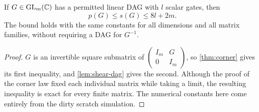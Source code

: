 \begin{corollary}
\label{cor:dag-price}
If $G\in\operatorname{GL}_m(\mathbb C)$ has a permitted linear DAG with $l$ scalar
gates, then
\[
 p(G)\le s(G)\le 8l+2m.
\]
The bound holds with the same constants for all dimensions and all
matrix families, without requiring a DAG for $G^{-1}$.
\end{corollary}

\begin{proof}
$G$ is an invertible square submatrix of
$\begin{pmatrix}I_m&G\\0&I_m\end{pmatrix}$, so
\cref{thm:corner} gives its first inequality, and
\cref{lem:shear-dag} gives the second.  Although the proof of the
corner law fixed each individual matrix while taking a limit, the
resulting inequality is exact for every finite matrix.  The numerical
constants here come entirely from the dirty scratch simulation.
\end{proof}
